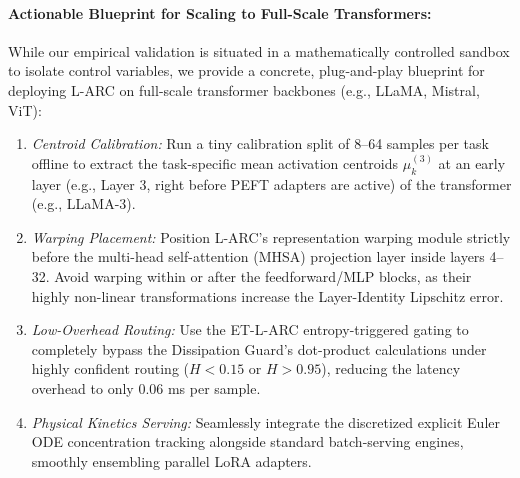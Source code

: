 \paragraph{Actionable Blueprint for Scaling to Full-Scale Transformers:}
While our empirical validation is situated in a mathematically controlled sandbox to isolate control variables, we provide a concrete, plug-and-play blueprint for deploying L-ARC on full-scale transformer backbones (e.g., LLaMA, Mistral, ViT):
\begin{enumerate}
    \item \emph{Centroid Calibration:} Run a tiny calibration split of 8--64 samples per task offline to extract the task-specific mean activation centroids $\mu_k^{(3)}$ at an early layer (e.g., Layer 3, right before PEFT adapters are active) of the transformer (e.g., LLaMA-3).
    \item \emph{Warping Placement:} Position L-ARC's representation warping module strictly before the multi-head self-attention (MHSA) projection layer inside layers 4--32. Avoid warping within or after the feedforward/MLP blocks, as their highly non-linear transformations increase the Layer-Identity Lipschitz error.
    \item \emph{Low-Overhead Routing:} Use the ET-L-ARC entropy-triggered gating to completely bypass the Dissipation Guard's dot-product calculations under highly confident routing ($H < 0.15$ or $H > 0.95$), reducing the latency overhead to only 0.06 ms per sample.
    \item \emph{Physical Kinetics Serving:} Seamlessly integrate the discretized explicit Euler ODE concentration tracking alongside standard batch-serving engines, smoothly ensembling parallel LoRA adapters.
\end{enumerate}
